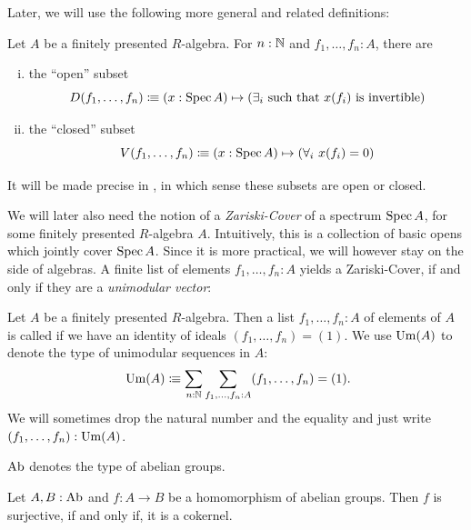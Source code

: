 Later, we will use the following more general and related definitions:

\begin{definition}
  \label{open-closed-affine-subsets}
  Let $A$ be a finitely presented $R$-algebra.
  For $n:\mathbb{N}$ and $f_1,\dots,f_n:A$, there are
  \begin{enumerate}[(i)]
  \item the ``open'' subset
    \[
      D(f_1,\dots,f_n)\vcentcolon\mspace{-1.2mu}\equiv (x:\operatorname{Spec} A)\mapsto (\text{$\exists_i$ such that $x(f_i)$ is invertible})
    \]  
  \item the ``closed'' subset
    \[
      V(f_1,\dots,f_n)\vcentcolon\mspace{-1.2mu}\equiv (x:\operatorname{Spec} A)\mapsto (\forall_i\ x(f_i)=0)
    \]  
  \end{enumerate}
  It will be made precise in , in which sense these subsets are open or closed.
\end{definition}

We will later also need the notion of a \emph{Zariski-Cover} of a spectrum $\operatorname{Spec} A$,
for some finitely presented $R$-algebra $A$.
Intuitively, this is a collection of basic opens which jointly cover $\operatorname{Spec} A$.
Since it is more practical, we will however stay on the side of algebras.
A finite list of elements $f_1,\dots,f_n:A$ yields a Zariski-Cover,
if and only if they are a \emph{unimodular vector}:

\begin{definition}
  \label{unimodular}
  Let $A$ be a finitely presented $R$-algebra.
  Then a list $f_1,\dots,f_n:A$ of elements of $A$ is called 
  if we have an identity of ideals $(f_1,\dots,f_n)=(1)$.
  We use $\mathrm{Um}(A)$ to denote the type of unimodular sequences in $A$:
  \[
    \Um(A)\colonequiv \sum_{n:\N}\sum_{f_1,\dots,f_n:A} (f_1,\dots,f_n)=(1)
    \rlap{.}
  \]
  We will sometimes drop the natural number and the equality and just write $(f_1,\dots,f_n):\mathrm{Um}(A)$.
\end{definition}

\begin{definition}
  $\AbGroup$\index{$\AbGroup$} denotes the type of abelian groups.
\end{definition}

\begin{lemma}%
  \label{surjective-abgroup-hom-is-cokernel}
  Let $A,B:\operatorname{Ab}$ and $f:A\to B$ be a homomorphism of abelian groups.
  Then $f$ is surjective, if and only if, it is a cokernel.
\end{lemma}

